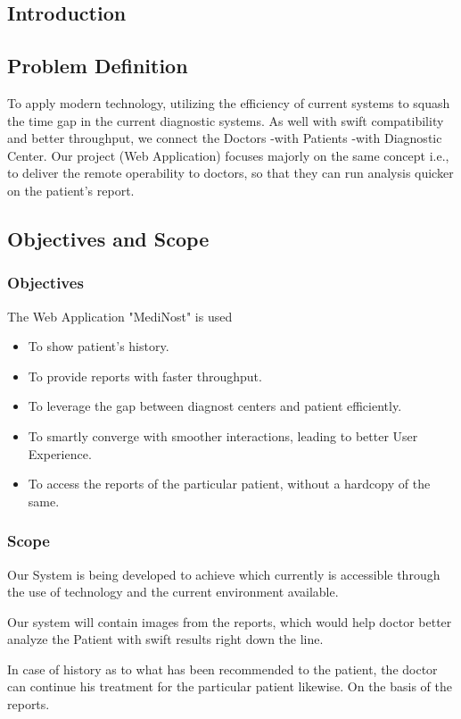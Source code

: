 \documentclass{article}
\begin{document}
\listoftables
\newpage
{} 
\setcounter{page}{1}
\begin{flushleft}
    \section{Introduction}
        \subsection{Problem Definition}
        \justifying
        To apply modern technology, utilizing the efficiency of current systems to squash the time gap in the current diagnostic systems. As well with swift compatibility and better throughput, we connect the Doctors -with Patients -with Diagnostic Center.
        Our project (Web Application) focuses majorly on the same concept i.e., to deliver the remote operability to doctors, so that they can run analysis quicker on the patient's report.
        \subsection{Objectives and Scope}
        \subsubsection{Objectives}
        The Web Application "MediNost" is used  
         \begin{itemize}
        \item To show patient's history.
        \item To provide reports with faster throughput.
        \item To leverage the gap between diagnost centers and patient efficiently.
        \item To smartly converge with smoother interactions, leading to better User Experience.
        \item To access the reports of the particular patient, without a hardcopy of the same.
        \end{itemize}
        \subsubsection{Scope}
        \justifying
        Our System is being developed to achieve which currently is accessible through the use of technology and the current environment available.
        \par
        Our system will contain images from the reports, which would help doctor better analyze the Patient with swift results right down the line.
        \par 
        In case of history as to what has been recommended to the patient, the doctor can continue his treatment for the particular patient likewise. On the basis of the reports.
        

\end{flushleft}
\end{document}
